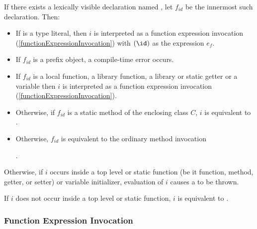 \documentclass{article}
\begin{document}
\LMHash{}
If there exists a lexically visible declaration named \id, let $f_{id}$ be the innermost such declaration.
Then:
\begin{itemize}
\item
If \id{} is a type literal, then $i$ is interpreted as a function expression invocation (\ref{functionExpressionInvocation}) with $(\id)$ as the expression $e_f$.
\item
If $f_{id}$ is a prefix object, a compile-time error occurs.
\item
If $f_{id}$ is a local function, a library function, a library or static getter or a variable then $i$ is interpreted as a function expression invocation (\ref{functionExpressionInvocation}).
\item
Otherwise, if $f_{id}$ is a static method of the enclosing class $C$, $i$ is equivalent to
.
\item Otherwise, $f_{id}$ is equivalent to the ordinary method invocation

.
\end{itemize}

\LMHash{}
Otherwise, if $i$ occurs inside a top level or static function (be it function, method, getter, or setter) or variable initializer, evaluation of $i$ causes a  to be thrown.

\LMHash{}
If $i$ does not occur inside a top level or static function, $i$ is equivalent to
.



\subsubsection{Function Expression Invocation}
\end{document}
